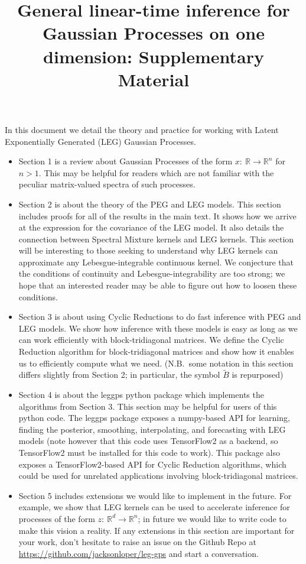 \documentclass{article}
\title{General linear-time inference for Gaussian Processes on one dimension: Supplementary Material}
\theoremstyle{definition}
\begin{document}
\maketitle

In this document we detail the theory and practice for working with Latent Exponentially Generated (LEG) Gaussian Processes.

\begin{itemize}
    \item Section 1 is a review about Gaussian Processes of the form $x:\ \mathbb{R} \rightarrow \mathbb{R}^n$ for $n>1$.  This may be helpful for readers which are not familiar with the peculiar matrix-valued spectra of such processes.
    \item Section 2 is about the theory of the PEG and LEG models.  This section includes proofs for all of the results in the main text.  It shows how we arrive at the expression for the covariance of the LEG model.  It also details the connection between Spectral Mixture kernels and LEG kernels.  This section will be interesting to those seeking to understand why LEG kernels can approximate any Lebesgue-integrable continuous kernel.  We conjecture that the conditions of continuity and Lebesgue-integrability are too strong; we hope that an interested reader may be able to figure out how to loosen these conditions.
    \item Section 3 is about using Cyclic Reductions to do fast inference with PEG and LEG models.  We show how inference with these models is easy as long as we can work efficiently with block-tridiagonal matrices.  We define the Cyclic Reduction algorithm for block-tridiagonal matrices and show how it enables us to efficiently compute what we need.  (N.B.\ some notation in this section differs slightly from Section 2; in particular, the symbol $\tilde B$ is repurposed)  
    \item Section 4 is about the leggps python package which implements the algorithms from Section 3.  This section may be helpful for users of this python code.  The leggps package exposes a numpy-based API for learning, finding the posterior, smoothing, interpolating, and forecasting with LEG models (note however that this code uses TensorFlow2 as a backend, so TensorFlow2 must be installed for this code to work).  This package also exposes a TensorFlow2-based API for Cyclic Reduction algorithms, which could be used for unrelated applications involving block-tridiagonal matrices.
    \item Section 5 includes extensions we would like to implement in the future.  For example, we show that LEG kernels can be used to accelerate inference for processes of the form $z:\ \mathbb{R}^d \rightarrow \mathbb{R}^n$; in future we would like to write code to make this vision a reality.  If any extensions in this section are important for your work, don't hesitate to raise an issue on the Github Repo at \url{https://github.com/jacksonloper/leg-gps} and start a conversation.
\end{itemize}
\end{document}
